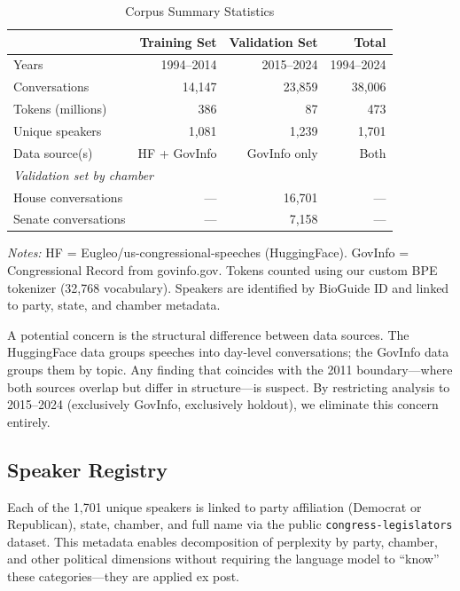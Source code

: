 \documentclass[12pt]{article}
\begin{document}
\begin{table}[H]
\centering
\caption{Corpus Summary Statistics}
\label{tab:corpus}
\begin{threeparttable}
\begin{tabular}{lrrr}
\toprule
& Training Set & Validation Set & Total \\
\midrule
Years & 1994--2014 & 2015--2024 & 1994--2024 \\
Conversations & 14,147 & 23,859 & 38,006 \\
Tokens (millions) & 386 & 87 & 473 \\
Unique speakers & 1,081 & 1,239 & 1,701 \\
Data source(s) & HF + GovInfo & GovInfo only & Both \\
\midrule
\multicolumn{4}{l}{\textit{Validation set by chamber}} \\
\quad House conversations & --- & 16,701 & --- \\
\quad Senate conversations & --- & 7,158 & --- \\
\bottomrule
\end{tabular}
\begin{tablenotes}[flushleft]
\small
\item \textit{Notes:} HF = Eugleo/us-congressional-speeches (HuggingFace). GovInfo = Congressional Record from govinfo.gov. Tokens counted using our custom BPE tokenizer (32,768 vocabulary). Speakers are identified by BioGuide ID and linked to party, state, and chamber metadata.
\end{tablenotes}
\end{threeparttable}
\end{table}

A potential concern is the structural difference between data sources. The HuggingFace data groups speeches into day-level conversations; the GovInfo data groups them by topic. Any finding that coincides with the 2011 boundary---where both sources overlap but differ in structure---is suspect. By restricting analysis to 2015--2024 (exclusively GovInfo, exclusively holdout), we eliminate this concern entirely.

\subsection{Speaker Registry}

Each of the 1,701 unique speakers is linked to party affiliation (Democrat or Republican), state, chamber, and full name via the public \texttt{congress-legislators} dataset. This metadata enables decomposition of perplexity by party, chamber, and other political dimensions without requiring the language model to ``know'' these categories---they are applied ex post.
\end{document}
